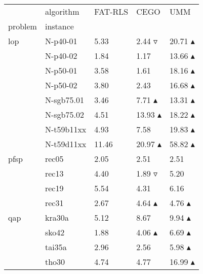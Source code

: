 \begin{tabular}{lllll}
\toprule
    & algorithm & FAT-RLS &                             CEGO &                              UMM \\
problem & instance &         &                                  &                                  \\
\midrule
lop & N-p40-01 &    5.33 &             2.44 $\triangledown$ &           20.71 $\blacktriangle$ \\
    & N-p40-02 &    1.84 &  1.17 \phantom{$\blacktriangle$} &           13.66 $\blacktriangle$ \\
    & N-p50-01 &    3.58 &  1.61 \phantom{$\blacktriangle$} &           18.16 $\blacktriangle$ \\
    & N-p50-02 &    3.80 &  2.43 \phantom{$\blacktriangle$} &           16.68 $\blacktriangle$ \\
    & N-sgb75.01 &    3.46 &            7.71 $\blacktriangle$ &           13.31 $\blacktriangle$ \\
    & N-sgb75.02 &    4.51 &           13.93 $\blacktriangle$ &           18.22 $\blacktriangle$ \\
    & N-t59b11xx &    4.93 &  7.58 \phantom{$\blacktriangle$} &           19.83 $\blacktriangle$ \\
    & N-t59d11xx &   11.46 &           20.97 $\blacktriangle$ &           58.82 $\blacktriangle$ \\
pfsp & rec05 &    2.05 &  2.51 \phantom{$\blacktriangle$} &  2.51 \phantom{$\blacktriangle$} \\
    & rec13 &    4.40 &             1.89 $\triangledown$ &  5.20 \phantom{$\blacktriangle$} \\
    & rec19 &    5.54 &  4.31 \phantom{$\blacktriangle$} &  6.16 \phantom{$\blacktriangle$} \\
    & rec31 &    2.67 &            4.64 $\blacktriangle$ &            4.76 $\blacktriangle$ \\
qap & kra30a &    5.12 &  8.67 \phantom{$\blacktriangle$} &            9.94 $\blacktriangle$ \\
    & sko42 &    1.88 &            4.06 $\blacktriangle$ &            6.69 $\blacktriangle$ \\
    & tai35a &    2.96 &  2.56 \phantom{$\blacktriangle$} &            5.98 $\blacktriangle$ \\
    & tho30 &    4.74 &  4.77 \phantom{$\blacktriangle$} &           16.99 $\blacktriangle$ \\
\bottomrule
\end{tabular}
